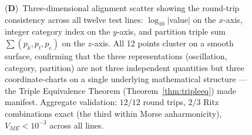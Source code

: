 \begin{figure}[!htbp]
{    (\textbf{D})~Three-dimensional alignment scatter showing the round-trip consistency across all twelve test lines: $\log_{10}|$value$|$ on the $x$-axis, integer category index on the $y$-axis, and partition triple sum $\sum (p_k, p_t, p_e)$ on the $z$-axis. All 12 points cluster on a smooth surface, confirming that the three representations (oscillation, category, partition) are not three independent quantities but three coordinate-charts on a single underlying mathematical structure --- the Triple Equivalence Theorem (Theorem~\ref{thm:tripleeq}) made manifest. Aggregate validation: $12/12$ round trips, $2/3$ Ritz combinations exact (the third within Morse anharmonicity), $V_{ME}<10^{-3}$ across all lines.}
    \label{fig:tripleconv}
\end{figure}


